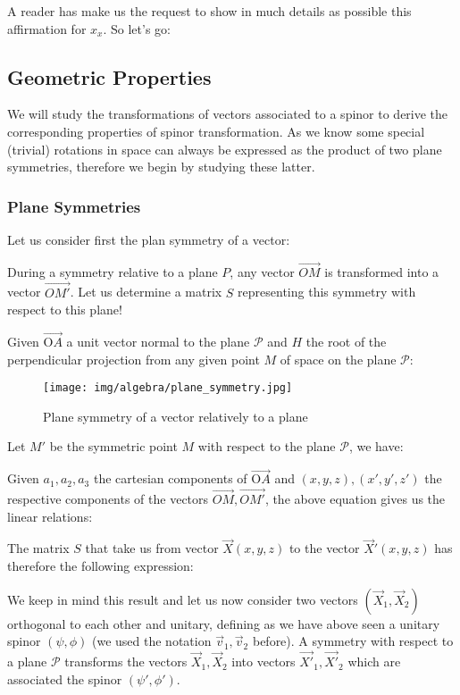 	A reader has make us the request to show in much details as possible this affirmation for $x_x$. So let's go:
	 
	
	\subsection{Geometric Properties}
	We will study the transformations of vectors associated to a spinor to derive the corresponding properties of spinor transformation. As we know some special (trivial) rotations in space can always be expressed as the product of two plane symmetries, therefore we begin by studying these latter.
	
	\subsubsection{Plane Symmetries}
	Let us consider first the plan symmetry of a vector:
	
	During a symmetry relative to a plane $P$, any vector $\overrightarrow{OM}$ is transformed into a vector $\overrightarrow{OM'}$. Let us determine a matrix $S$ representing this symmetry with respect to this plane! 
	
	Given $\overrightarrow{\text{O}A}$ a unit vector normal to the plane $\mathcal{P}$ and $H$  the root of the perpendicular projection from any given point $M$ of space on the plane $\mathcal{P}$:
	
	\begin{figure}[H]
		\centering
		\texttt{[image: img/algebra/plane\_symmetry.jpg]}
		\caption[]{Plane symmetry of a vector relatively to a plane}
	\end{figure}
	Let $M'$ be the symmetric point $M$ with respect to the plane $\mathcal{P}$, we have:
	
	Given $a_1,a_2,a_3$ the cartesian components of $\overrightarrow{\text{O}A}$ and $(x,y,z),(x',y',z')$ the respective components of the vectors $\overrightarrow{OM},\overrightarrow{OM'}$, the above equation gives us the linear relations:
	
	The matrix $S$ that take us from vector $\vec{X}(x,y,z)$ to the vector $\vec{X}'(x,y,z)$ has therefore the following expression:
	
	We keep in mind this result and let us now consider two vectors $(\vec{X}_1,\vec{X}_2)$ orthogonal to each other and unitary, defining as we have above  seen a unitary spinor $(\psi,\phi)$ (we used the notation $\vec{v}_1,\vec{v}_2$ before). A symmetry with respect to a plane $\mathcal{P}$ transforms the vectors $\vec{X}_1,\vec{X}_2$ into vectors $\vec{X'}_1,\vec{X'}_2$ which are associated the spinor $(\psi',\phi')$. 
	
